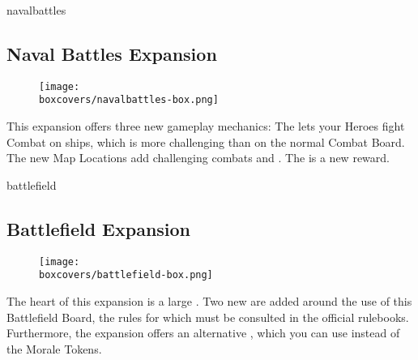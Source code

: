 \begin{multicols*}{2}
\begin{expansion}[title=]{navalbattles}
  \subsection*{\color{navalbattles}Naval Battles Expansion}
  \setlength\intextsep{0pt}
  \setlength\columnsep{0.8em}
  \begin{wrapfigure}{l}{0.35\textwidth}
    \texttt{[image: \\boxcovers/navalbattles-box.png]}
  \end{wrapfigure}
  This expansion offers three new gameplay mechanics:
  The  lets your Heroes fight Combat on ships, which is more challenging than on the normal Combat Board.
  The new  Map Locations add challenging combats and .
  The  is a new reward.
\end{expansion}

\columnbreak
\begin{expansion}[title=]{battlefield}
  \subsection*{\color{battlefield}Battlefield Expansion}
  \setlength\intextsep{0pt}
  \setlength\columnsep{0.8em}
  \begin{wrapfigure}{l}{0.35\textwidth}
    \texttt{[image: \\boxcovers/battlefield-box.png]}
  \end{wrapfigure}
  The heart of this expansion is a large . Two new  are added around the use of this Battlefield Board, the rules for which must be consulted in the official rulebooks. Furthermore, the expansion offers an alternative , which you can use instead of the Morale Tokens.
\end{expansion}
\end{multicols*}

